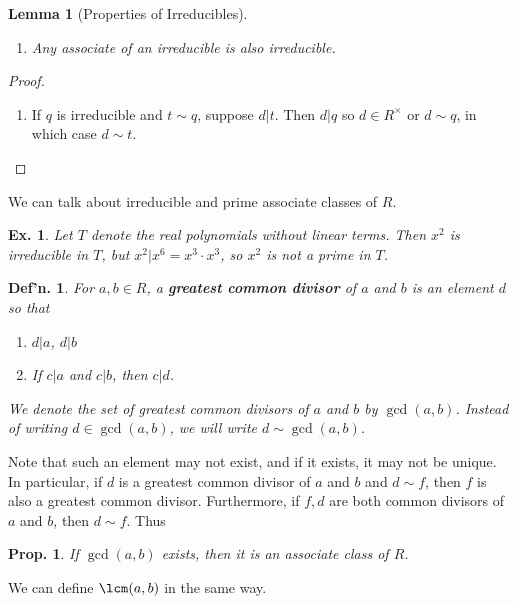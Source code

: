 \documentclass[12pt, a4paper]{book}
\newtheorem{lemma}[theorem]{Lemma}
\newtheorem{definition}[theorem]{Def'n.}
\newtheorem{proposition}[theorem]{Prop.}
\newtheorem{example}[theorem]{Ex.}
\theoremstyle{nonumberplain}
\newtheorem{proof}{Proof}
\begin{document}
\begin{lemma}[Properties of Irreducibles]
    \begin{enumerate}[nolistsep]
        \item Any associate of an irreducible is also irreducible.
    \end{enumerate}
\end{lemma}
\begin{proof}
    \begin{enumerate}[nolistsep]
        \item If $q$ is irreducible and $t\sim q$, suppose $d|t$.
            Then $d|q$ so $d\in R^\times$ or $d\sim q$, in which case $d\sim t$.
    \end{enumerate}
\end{proof}
We can talk about irreducible and prime associate classes of $R$.
\begin{example}
    Let $T$ denote the real polynomials without linear terms.
    Then $x^2$ is irreducible in $T$, but $x^2|x^6=x^3\cdot x^3$, so $x^2$ is not a prime in $T$.
\end{example}
\begin{definition}
    For $a,b\in R$, a \textbf{greatest common divisor} of $a$ and $b$ is an element $d$ so that
    \begin{enumerate}
        \item $d|a$, $d|b$
        \item If $c|a$ and $c|b$, then $c|d$.
    \end{enumerate}
    We denote the set of greatest common divisors of $a$ and $b$ by $\gcd(a,b)$.
    Instead of writing $d\in \gcd(a,b)$, we will write $d\sim\gcd(a,b)$.
\end{definition}
Note that such an element may not exist, and if it exists, it may not be unique.
In particular, if $d$ is a greatest common divisor of $a$ and $b$ and $d\sim f$, then $f$ is also a greatest common divisor.
Furthermore, if $f,d$ are both common divisors of $a$ and $b$, then $d\sim f$.
Thus
\begin{proposition}
    If $\gcd(a,b)$ exists, then it is an associate class of $R$.
\end{proposition}
We can define $\lcm(a,b)$ in the same way.
\end{document}
